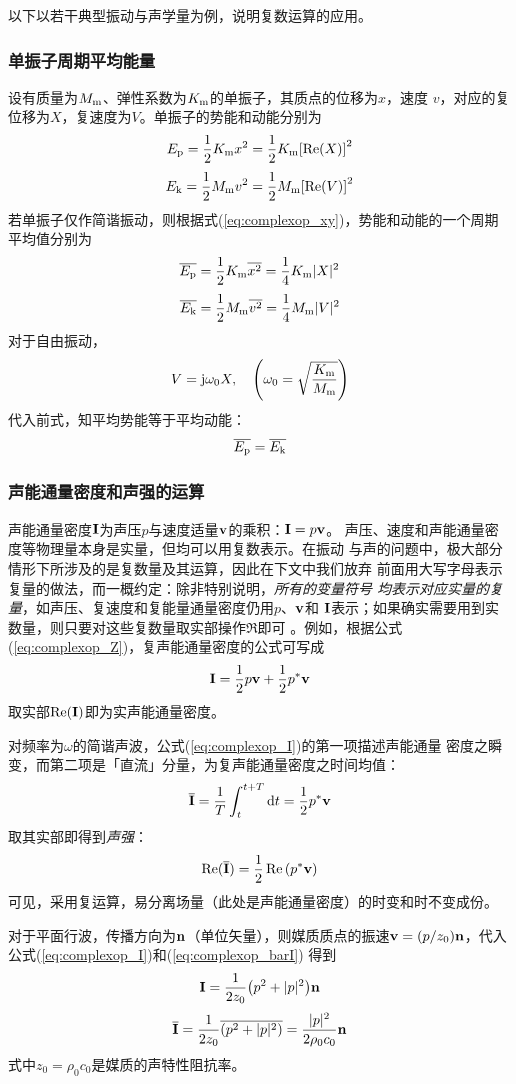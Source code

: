 \documentclass[UTF8]{ctexbook}
\begin{document}
以下以若干典型振动与声学量为例，说明复数运算的应用。

\subsubsection{单振子周期平均能量}
设有质量为$M_\text{m}$、弹性系数为$K_\text{m}$的单振子，其质点的位移为$x$，速度
$v$，对应的复位移为$X$，复速度为$V$。单振子的势能和动能分别为
$$E_\text{p} = \frac12 K_\text{m} x^2 = \frac12 K_\text{m}\qty[\Re(X)]^2$$
$$E_\text{k} = \frac12 M_\text{m} v^2 = \frac12 M_\text{m} \qty[\Re(V)]^2$$
若单振子仅作简谐振动，则根据式(\ref{eq:complexop_xy})，势能和动能的一个周期
平均值分别为
$$\overline{E_\text{p}} = \frac12 K_\text{m} \overline{x^2} = \frac14 K_\text{m}
|X|^2$$
$$\overline{E_\text{k}} = \frac12 M_\text{m} \overline{v^2} = \frac14 M_\text{m}
|V|^2$$
对于自由振动，
$$V = \mj \omega_0 X\qc \qty(\omega_0 = \sqrt{\frac{K\st{m}}{M\st{m}}})$$
代入前式，知平均势能等于平均动能：
$$\overline{E_\text{p}} = \overline{E_\text{k}}$$

\subsubsection{声能通量密度和声强的运算}
声能通量密度$\vb{I}$为声压$p$与速度适量$\vb{v}$的乘积：$\vb{I}=p \vb{v}$。
声压、速度和声能通量密度等物理量本身是实量，但均可以用复数表示。在振动
与声的问题中，极大部分情形下所涉及的是复数量及其运算，因此在下文中我们放弃
前面用大写字母表示复量的做法，而一概约定：除非特别说明，\emph{所有的变量符号
均表示对应实量的复量}，如声压、复速度和复能量通量密度仍用$p$、$\vb{v}$和
$\vb{I}$表示；如果确实需要用到实数量，则只要对这些复数量取实部操作$\Re$即可
。例如，根据公式(\ref{eq:complexop_Z})，复声能通量密度的公式可写成
\begin{equation}
	\label{eq:complexop_I}
	\vb{I} = \frac12 p\vb{v} + \frac12 p^* \vb{v}
\end{equation}
取实部$\Re(\vb{I})$即为实声能通量密度。

对频率为$\omega$的简谐声波，公式(\ref{eq:complexop_I})的第一项描述声能通量
密度之瞬变，而第二项是「直流」分量，为复声能通量密度之时间均值：
\begin{equation}
	\label{eq:complexop_barI}
	\overline{\vb{I}} = \frac1T \int_t^{t+T}\dd{t} = \frac12 p^* \vb{v}
\end{equation}
取其实部即得到\emph{声强}：
$$\Re(\overline{\vb{I}}) = \frac12 \Re\qty(p^* \vb{v})$$
可见，采用复运算，易分离场量（此处是声能通量密度）的时变和时不变成份。

对于平面行波，传播方向为$\vb{n}$（单位矢量），则媒质质点的振速$\vb{v}
=(p/z_0)\vb{n}$，代入公式(\ref{eq:complexop_I})和(\ref{eq:complexop_barI})
得到
$$\vb{I} = \frac{1}{2z_0}\qty(p^2+|p|^2)\vb{n}$$
$$\overline{\vb{I}} = \frac{1}{2z_0} \overline{\qty(p^2+|p|^2)}
=\frac{|p|^2}{2\rho_0 c_0 }\vb{n}$$
式中$z_0=\rho_0c_0$是媒质的声特性阻抗率。
\end{document}
